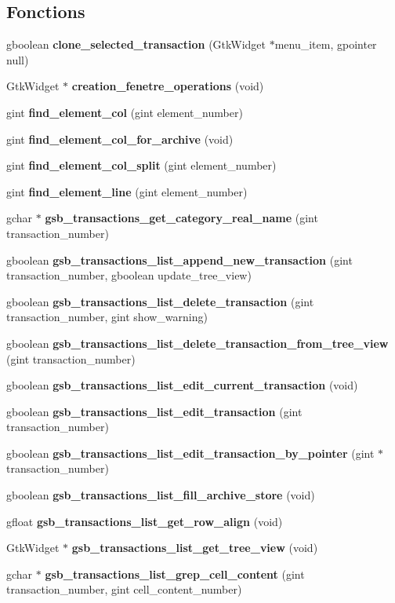 \subsection*{Fonctions}
\begin{DoxyCompactItemize}
\item 
gboolean {\bf clone\_\-selected\_\-transaction} (GtkWidget $\ast$menu\_\-item, gpointer null)
\item 
GtkWidget $\ast$ {\bf creation\_\-fenetre\_\-operations} (void)
\item 
gint {\bf find\_\-element\_\-col} (gint element\_\-number)
\item 
gint {\bf find\_\-element\_\-col\_\-for\_\-archive} (void)
\item 
gint {\bf find\_\-element\_\-col\_\-split} (gint element\_\-number)
\item 
gint {\bf find\_\-element\_\-line} (gint element\_\-number)
\item 
gchar $\ast$ {\bf gsb\_\-transactions\_\-get\_\-category\_\-real\_\-name} (gint transaction\_\-number)
\item 
gboolean {\bf gsb\_\-transactions\_\-list\_\-append\_\-new\_\-transaction} (gint transaction\_\-number, gboolean update\_\-tree\_\-view)
\item 
gboolean {\bf gsb\_\-transactions\_\-list\_\-delete\_\-transaction} (gint transaction\_\-number, gint show\_\-warning)
\item 
gboolean {\bf gsb\_\-transactions\_\-list\_\-delete\_\-transaction\_\-from\_\-tree\_\-view} (gint transaction\_\-number)
\item 
gboolean {\bf gsb\_\-transactions\_\-list\_\-edit\_\-current\_\-transaction} (void)
\item 
gboolean {\bf gsb\_\-transactions\_\-list\_\-edit\_\-transaction} (gint transaction\_\-number)
\item 
gboolean {\bf gsb\_\-transactions\_\-list\_\-edit\_\-transaction\_\-by\_\-pointer} (gint $\ast$transaction\_\-number)
\item 
gboolean {\bf gsb\_\-transactions\_\-list\_\-fill\_\-archive\_\-store} (void)
\item 
gfloat {\bf gsb\_\-transactions\_\-list\_\-get\_\-row\_\-align} (void)
\item 
GtkWidget $\ast$ {\bf gsb\_\-transactions\_\-list\_\-get\_\-tree\_\-view} (void)
\item 
gchar $\ast$ {\bf gsb\_\-transactions\_\-list\_\-grep\_\-cell\_\-content} (gint transaction\_\-number, gint cell\_\-content\_\-number)
\item 

\end{DoxyCompactItemize}
